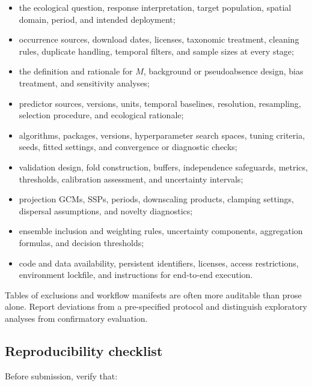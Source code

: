 \begin{itemize}
\item the ecological question, response interpretation, target population, spatial domain, period, and intended deployment;
\item occurrence sources, download dates, licenses, taxonomic treatment, cleaning rules, duplicate handling, temporal filters, and sample sizes at every stage;
\item the definition and rationale for \(M\), background or pseudoabsence design, bias treatment, and sensitivity analyses;
\item predictor sources, versions, units, temporal baselines, resolution, resampling, selection procedure, and ecological rationale;
\item algorithms, packages, versions, hyperparameter search spaces, tuning criteria, seeds, fitted settings, and convergence or diagnostic checks;
\item validation design, fold construction, buffers, independence safeguards, metrics, thresholds, calibration assessment, and uncertainty intervals;
\item projection GCMs, SSPs, periods, downscaling products, clamping settings, dispersal assumptions, and novelty diagnostics;
\item ensemble inclusion and weighting rules, uncertainty components, aggregation formulas, and decision thresholds;
\item code and data availability, persistent identifiers, licenses, access restrictions, environment lockfile, and instructions for end-to-end execution.
\end{itemize}

Tables of exclusions and workflow manifests are often more auditable than prose alone. Report deviations from a pre-specified protocol and distinguish exploratory analyses from confirmatory evaluation.

\subsection{Reproducibility checklist}

Before submission, verify that:

